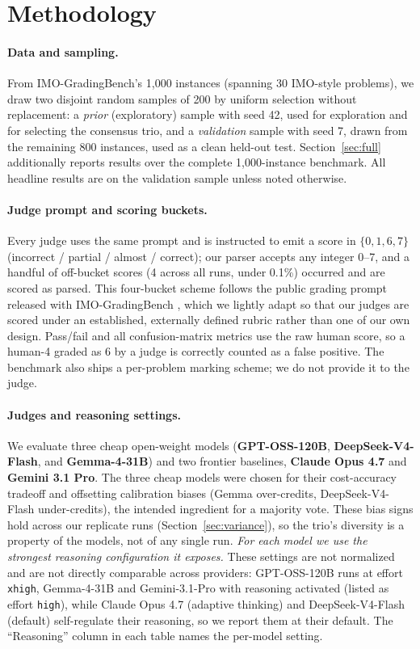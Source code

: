 \documentclass{article}
\begin{document}
\section{Methodology}
\label{sec:method}

\paragraph{Data and sampling.}
From IMO-GradingBench's 1{,}000 instances (spanning 30 IMO-style problems), we
draw two disjoint random samples of 200 by uniform selection without replacement:
a \emph{prior} (exploratory) sample with seed 42, used for exploration and for
selecting the consensus trio, and a \emph{validation} sample with seed 7, drawn
from the remaining 800 instances, used as a clean held-out test.
Section~\ref{sec:full} additionally reports results over the complete
1{,}000-instance benchmark. All headline results are on the validation sample
unless noted otherwise.

\paragraph{Judge prompt and scoring buckets.}
Every judge uses the same prompt and is instructed to emit a score in
$\{0, 1, 6, 7\}$ (incorrect / partial / almost / correct); our parser accepts any
integer 0--7, and a handful of off-bucket scores (4 across all runs, under 0.1\%)
occurred and are scored as parsed. This four-bucket scheme follows the public grading
prompt released with IMO-GradingBench \citep{luong2025robust}, which we lightly adapt
so that our judges are scored under an established, externally defined rubric
rather than one of our own design. Pass/fail and all confusion-matrix metrics use
the raw human score, so a human-4 graded as 6 by a judge is correctly counted as
a false positive. The benchmark also ships a per-problem marking scheme; we do not
provide it to the judge.

\paragraph{Judges and reasoning settings.}
We evaluate three cheap open-weight models (\textbf{GPT-OSS-120B},
\textbf{DeepSeek-V4-Flash}, and \textbf{Gemma-4-31B}) and two frontier baselines,
\textbf{Claude Opus 4.7} and \textbf{Gemini 3.1 Pro}. The three cheap models were
chosen for their cost-accuracy tradeoff and offsetting calibration biases (Gemma
over-credits, DeepSeek-V4-Flash under-credits), the intended ingredient for a
majority vote. These bias signs hold across our replicate runs
(Section~\ref{sec:variance}), so the trio's diversity is a property of the models,
not of any single run. \emph{For each model we use the strongest reasoning
configuration it exposes.} These settings are not normalized and are not directly
comparable across providers: GPT-OSS-120B runs at effort \texttt{xhigh},
Gemma-4-31B and Gemini-3.1-Pro with reasoning activated (listed as effort
\texttt{high}), while Claude Opus 4.7 (adaptive thinking) and DeepSeek-V4-Flash
(default) self-regulate their reasoning, so we report them at their default. The
``Reasoning'' column in each table names the per-model setting.
\end{document}
